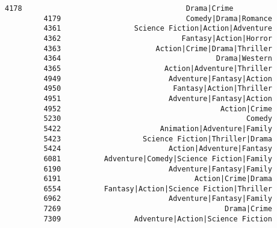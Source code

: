 \documentclass[11pt]{article}
\begin{document}
\begin{Verbatim}[commandchars=\\\{\}]
         4178                                      Drama|Crime   
         4179                             Comedy|Drama|Romance   
         4361                 Science Fiction|Action|Adventure   
         4362                            Fantasy|Action|Horror   
         4363                      Action|Crime|Drama|Thriller   
         4364                                    Drama|Western   
         4365                        Action|Adventure|Thriller   
         4949                         Adventure|Fantasy|Action   
         4950                          Fantasy|Action|Thriller   
         4951                         Adventure|Fantasy|Action   
         4952                                     Action|Crime   
         5230                                           Comedy   
         5422                       Animation|Adventure|Family   
         5423                   Science Fiction|Thriller|Drama   
         5424                         Action|Adventure|Fantasy   
         6081          Adventure|Comedy|Science Fiction|Family   
         6190                         Adventure|Fantasy|Family   
         6191                               Action|Crime|Drama   
         6554          Fantasy|Action|Science Fiction|Thriller   
         6962                         Adventure|Fantasy|Family   
         7269                                      Drama|Crime   
         7309                 Adventure|Action|Science Fiction   
         

\end{Verbatim}
\end{document}
